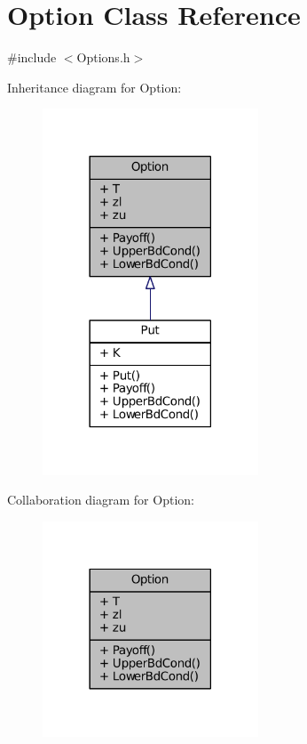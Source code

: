 \hypertarget{classOption}{\section{Option Class Reference}
\label{classOption}
}


{\ttfamily \#include $<$Options.\+h$>$}



Inheritance diagram for Option\+:\nopagebreak
\begin{figure}[H]
\begin{center}
\leavevmode
\includegraphics[width=182pt]{classOption__inherit__graph}
\end{center}
\end{figure}


Collaboration diagram for Option\+:\nopagebreak
\begin{figure}[H]
\begin{center}
\leavevmode
\includegraphics[width=182pt]{classOption__coll__graph}
\end{center}
\end{figure}
